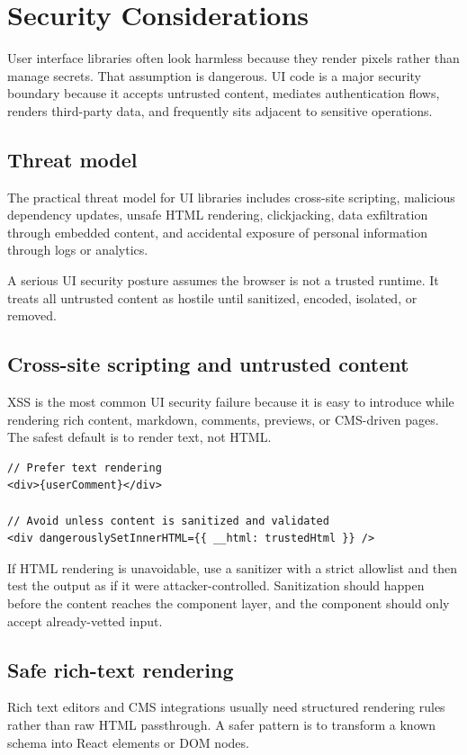 \clearpage
\section{Security Considerations}

User interface libraries often look harmless because they render pixels rather than manage secrets. That assumption is dangerous. UI code is a major security boundary because it accepts untrusted content, mediates authentication flows, renders third-party data, and frequently sits adjacent to sensitive operations.

\subsection{Threat model}
The practical threat model for UI libraries includes cross-site scripting, malicious dependency updates, unsafe HTML rendering, clickjacking, data exfiltration through embedded content, and accidental exposure of personal information through logs or analytics.

A serious UI security posture assumes the browser is not a trusted runtime. It treats all untrusted content as hostile until sanitized, encoded, isolated, or removed.

\subsection{Cross-site scripting and untrusted content}
XSS is the most common UI security failure because it is easy to introduce while rendering rich content, markdown, comments, previews, or CMS-driven pages. The safest default is to render text, not HTML.

\begin{verbatim}
// Prefer text rendering
<div>{userComment}</div>

// Avoid unless content is sanitized and validated
<div dangerouslySetInnerHTML={{ __html: trustedHtml }} />
\end{verbatim}

If HTML rendering is unavoidable, use a sanitizer with a strict allowlist and then test the output as if it were attacker-controlled. Sanitization should happen before the content reaches the component layer, and the component should only accept already-vetted input.

\subsection{Safe rich-text rendering}
Rich text editors and CMS integrations usually need structured rendering rules rather than raw HTML passthrough. A safer pattern is to transform a known schema into React elements or DOM nodes.

